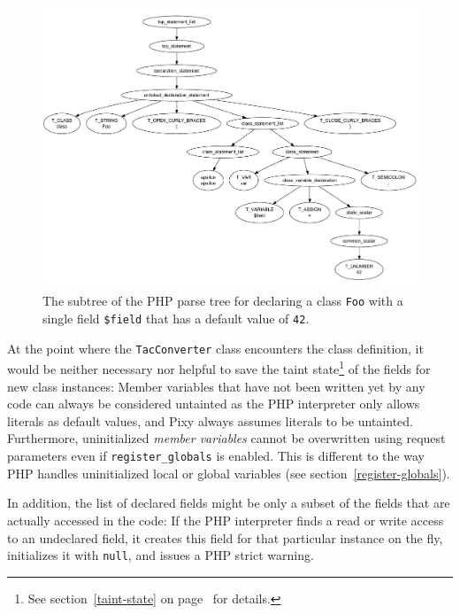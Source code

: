 \begin{figure}[htb]
  \begin{center}
    \includegraphics[scale=0.5]{images/parsetree-foo-class-declaration}
   \caption{The subtree of the PHP parse tree for declaring a class \texttt{Foo} with a single field \texttt{\$field} that has a default value of \texttt{42}.}
   \label{fig:parse-tree-foo-class}
  \end{center}
\end{figure}

At the point where the \texttt{TacConverter} class encounters the class definition, it would be neither necessary nor helpful to save the taint state\footnote{See section~\ref{taint-state} on page~\pageref{taint-state} for details.} of the fields for new class instances: Member variables that have not been written yet by any code can always be considered untainted as the PHP interpreter only allows literals as default values, and Pixy always assumes literals to be untainted. Furthermore, uninitialized \emph{member variables} cannot be overwritten using request parameters even if \texttt{register\_globals} is enabled. This is different to the way PHP handles uninitialized local or global variables (see section~\ref{register-globals}).

In addition, the list of declared fields might be only a subset of the fields that are actually accessed in the code: If the PHP interpreter finds a read or write access to an undeclared field, it creates this field for that particular instance on the fly, initializes it with \texttt{null}, and issues a PHP strict warning.


